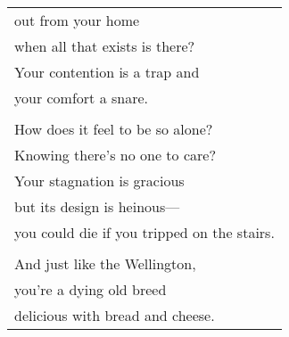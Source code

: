 \documentclass{article}
\begin{document}
\begin{center}
\begin{longtable}{l}
out from your home \\
when all that exists is there? \\
Your contention is a trap and \\
your comfort a snare. \\
\\
How does it feel to be so alone? \\
Knowing there's no one to care? \\
Your stagnation is gracious \\
but its design is heinous--- \\
you could die if you tripped on the stairs. \\
\\
And just like the Wellington, \\
you're a dying old breed \\
delicious with bread and cheese. \\


\end{longtable}
\end{center}
\end{document}
